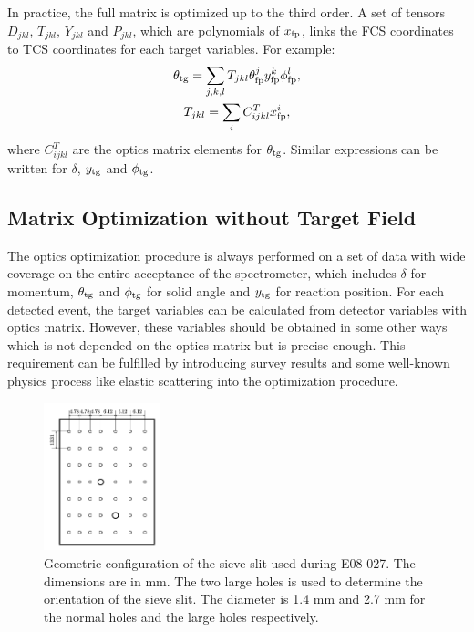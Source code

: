 In practice, the full matrix is optimized up to the third order. A set of tensors $D_{jkl}$, $T_{jkl}$, $Y_{jkl}$ and $P_{jkl}$, which are polynomials of $x_{\mathrm{fp}}$, links the FCS coordinates to TCS coordinates for each target variables. For example:
\begin{gather} \label{C6S2E3}
\theta_{\mathrm{tg}} = \sum_{j,k,l} T_{jkl} \theta_{\mathrm{fp}}^j y_{\mathrm{fp}}^k \phi_{\mathrm{fp}}^l, \\ \label{C6S2E4}
T_{jkl} = \sum_i C_{ijkl}^{T} x_{\mathrm{fp}}^i,
\end{gather}
where $C_{ijkl}^{T}$ are the optics matrix elements for $\theta_{\mathrm{tg}}$. Similar expressions can be written for $\delta$, $y_{\mathrm{tg}}$ and $\phi_{\mathrm{tg}}$.

\subsection{Matrix Optimization without Target Field}
\label{C6S2SS2}

The optics optimization procedure is always performed on a set of data with wide coverage on the entire acceptance of the spectrometer, which includes $\delta$ for momentum, $\theta_{\mathrm{tg}}$ and $\phi_{\mathrm{tg}}$ for solid angle and $y_{\mathrm{tg}}$ for reaction position. For each detected event, the target variables can be calculated from detector variables with optics matrix. However, these variables should be obtained in some other ways which is not depended on the optics matrix but is precise enough. This requirement can be fulfilled by introducing survey results and some well-known physics process like elastic scattering into the optimization procedure.

\begin{figure}[b!]
  \centering
  \includegraphics[width=0.3\textwidth]{figs/sieve-slit.png}
  \caption[Geometric configuration of the sieve slit.]{Geometric configuration of the sieve slit used during E08-027. The dimensions are in mm. The two large holes is used to determine the orientation of the sieve slit. The diameter is 1.4 mm and 2.7 mm for the normal holes and the large holes respectively. \label{C6S2F1}}
\end{figure}

